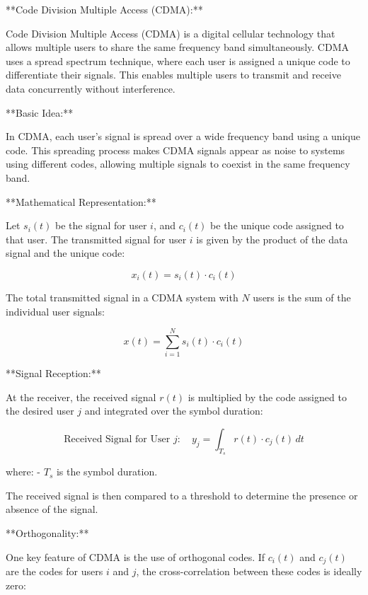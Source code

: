 \documentclass[colorlinks,11pt,a4paper,normalphoto,withhyper,ragged2e]{altareport}
\begin{document}
				
				
				
				
				
				
				
				**Code Division Multiple Access (CDMA):**
				
				Code Division Multiple Access (CDMA) is a digital cellular technology that allows multiple users to share the same frequency band simultaneously. CDMA uses a spread spectrum technique, where each user is assigned a unique code to differentiate their signals. This enables multiple users to transmit and receive data concurrently without interference.
				
				**Basic Idea:**
				
				In CDMA, each user's signal is spread over a wide frequency band using a unique code. This spreading process makes CDMA signals appear as noise to systems using different codes, allowing multiple signals to coexist in the same frequency band.
				
				**Mathematical Representation:**
				
				Let \( s_i(t) \) be the signal for user \( i \), and \( c_i(t) \) be the unique code assigned to that user. The transmitted signal for user \( i \) is given by the product of the data signal and the unique code:
				
				\[ x_i(t) = s_i(t) \cdot c_i(t) \]
				
				The total transmitted signal in a CDMA system with \( N \) users is the sum of the individual user signals:
				
				\[ x(t) = \sum_{i=1}^{N} s_i(t) \cdot c_i(t) \]
				
				**Signal Reception:**
				
				At the receiver, the received signal \( r(t) \) is multiplied by the code assigned to the desired user \( j \) and integrated over the symbol duration:
				
				\[ \text{Received Signal for User } j: \quad y_j = \int_{T_s} r(t) \cdot c_j(t) \, dt \]
				
				where:
				- \( T_s \) is the symbol duration.
				
				The received signal is then compared to a threshold to determine the presence or absence of the signal.
				
				**Orthogonality:**
				
				One key feature of CDMA is the use of orthogonal codes. If \( c_i(t) \) and \( c_j(t) \) are the codes for users \( i \) and \( j \), the cross-correlation between these codes is ideally zero:
				
\end{document}
